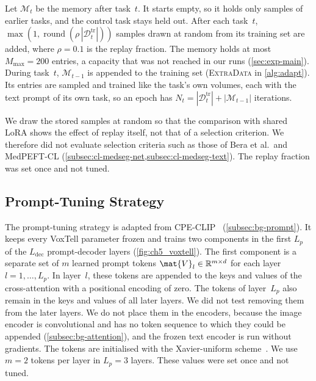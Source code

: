 Let $\mathcal{M}_t$ be the memory after task~$t$.
It starts empty, so it holds only samples of earlier tasks, and the control task stays held out.
After each task~$t$, $\max(1, \operatorname{round}(\rho \, |\mathcal{D}_t^{\mathrm{tr}}|))$ samples drawn at random from its training set are added, where $\rho = 0.1$ is the replay fraction.
The memory holds at most $M_{\max} = 200$ entries, a capacity that was not reached in our runs (\cref{sec:exp-main}).
During task~$t$, $\mathcal{M}_{t-1}$ is appended to the training set (\textsc{ExtraData} in \cref{alg:adapt}).
Its entries are sampled and trained like the task's own volumes, each with the text prompt of its own task, so an epoch has $N_t = |\mathcal{D}_t^{\mathrm{tr}}| + |\mathcal{M}_{t-1}|$ iterations.

We draw the stored samples at random so that the comparison with shared LoRA shows the effect of replay itself, not that of a selection criterion.
We therefore did not evaluate selection criteria such as those of Bera et al.\ and MedPEFT-CL (\cref{subsec:cl-medseg-net,subsec:cl-medseg-text}).
The replay fraction was set once and not tuned.

\subsection{Prompt-Tuning Strategy}
\label{subsec:method-prompt}

The prompt-tuning strategy is adapted from CPE-CLIP~\cite{D_Alessandro_2023} (\cref{subsec:bg-prompt}).
It keeps every VoxTell parameter frozen and trains two components in the first $L_p$ of the $L_{\mathrm{dec}}$ prompt-decoder layers (\cref{fig:ch5_voxtell}).
The first component is a separate set of $m$ learned prompt tokens $\mat{V}_l \in \mathbb{R}^{m \times d}$ for each layer $l = 1, \dots, L_p$.
In layer~$l$, these tokens are appended to the keys and values of the cross-attention with a positional encoding of zero.
The tokens of layer~$L_p$ also remain in the keys and values of all later layers.
We did not test removing them from the later layers.
We do not place them in the encoders, because the image encoder is convolutional and has no token sequence to which they could be appended (\cref{subsec:bg-attention}), and the frozen text encoder is run without gradients.
The tokens are initialised with the Xavier-uniform scheme~\cite{glorot2010understanding}.
We use $m = 2$ tokens per layer in $L_p = 3$ layers.
These values were set once and not tuned.

